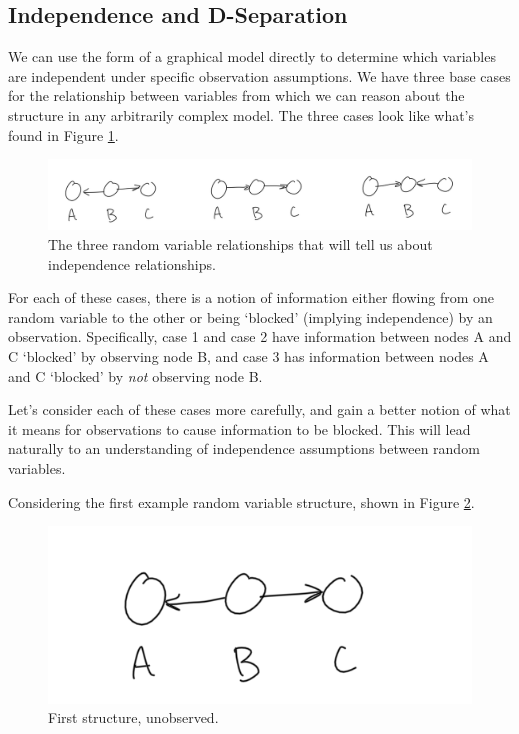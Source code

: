 \subsection{Independence and D-Separation}
We can use the form of a graphical model directly to determine which variables are independent under specific observation assumptions. We have three base cases for the relationship between variables from which we can reason about the structure in any arbitrarily complex model. The three cases look like what's found in Figure \ref{fig:indep-structure}.
\begin{figure}
	\centering
	\includegraphics[width=0.5\paperwidth]{../GraphicalModels/fig/indep-structure.png}
    \caption{The three random variable relationships that will tell us about independence relationships.}
	\label{fig:indep-structure}
\end{figure}
For each of these cases, there is a notion of information either flowing from one random variable to the other or being `blocked' (implying independence) by an observation. Specifically, case 1 and case 2 have information between nodes A and C `blocked' by observing node B, and case 3 has information between nodes A and C `blocked' by \textit{not} observing node B.

Let's consider each of these cases more carefully, and gain a better notion of what it means for observations to cause information to be blocked. This will lead naturally to an understanding of independence assumptions between random variables.

Considering the first example random variable structure, shown in Figure \ref{fig:first-case-unobserved}.
\begin{figure}
	\centering
	\includegraphics[width=0.5\paperwidth]{../GraphicalModels/fig/first-case-unobserved.png}
	\caption{First structure, unobserved.}
	\label{fig:first-case-unobserved}
\end{figure}

